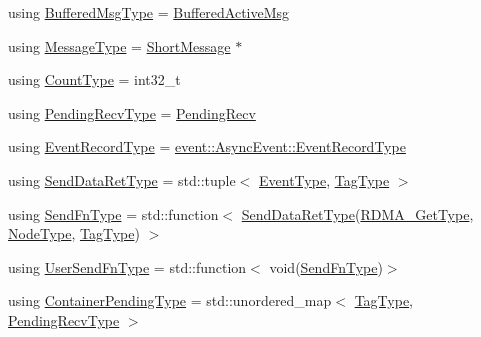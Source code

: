 \begin{DoxyCompactItemize}
\item 
using \hyperlink{structvt_1_1messaging_1_1_active_messenger_a80a9cbda399d7bf035bfcecc761f4b02}{Buffered\+Msg\+Type} = \hyperlink{structvt_1_1messaging_1_1_buffered_active_msg}{Buffered\+Active\+Msg}
\item 
using \hyperlink{structvt_1_1messaging_1_1_active_messenger_a8a749506cb4813230f9bfeeac1b119c9}{Message\+Type} = \hyperlink{namespacevt_a1125ac1da6c0bbf141e0ea0739d7602d}{Short\+Message} $\ast$
\item 
using \hyperlink{structvt_1_1messaging_1_1_active_messenger_aa69cbede6a9fbc4d727bfb38d5546600}{Count\+Type} = int32\+\_\+t
\item 
using \hyperlink{structvt_1_1messaging_1_1_active_messenger_add1d7ab7bf168d53dfe7b93f29f64f02}{Pending\+Recv\+Type} = \hyperlink{structvt_1_1messaging_1_1_pending_recv}{Pending\+Recv}
\item 
using \hyperlink{structvt_1_1messaging_1_1_active_messenger_aed736a2b2eaa0f96971a4f0be3fe0a25}{Event\+Record\+Type} = \hyperlink{structvt_1_1event_1_1_async_event_a5b4ef37db6e5962fdc0e6e0e56e74bc1}{event\+::\+Async\+Event\+::\+Event\+Record\+Type}
\item 
using \hyperlink{structvt_1_1messaging_1_1_active_messenger_a839987e944b6b9c681bc56efbea1f220}{Send\+Data\+Ret\+Type} = std\+::tuple$<$ \hyperlink{namespacevt_a009267401def7ae8bf201892222d060f}{Event\+Type}, \hyperlink{namespacevt_a84ab281dae04a52a4b243d6bf62d0e52}{Tag\+Type} $>$
\item 
using \hyperlink{structvt_1_1messaging_1_1_active_messenger_a9821bc2d924729107f08fadf5a217537}{Send\+Fn\+Type} = std\+::function$<$ \hyperlink{structvt_1_1messaging_1_1_active_messenger_a839987e944b6b9c681bc56efbea1f220}{Send\+Data\+Ret\+Type}(\hyperlink{namespacevt_a1cab7f4860f65a49ad2c042d6240f288}{R\+D\+M\+A\+\_\+\+Get\+Type}, \hyperlink{namespacevt_a866da9d0efc19c0a1ce79e9e492f47e2}{Node\+Type}, \hyperlink{namespacevt_a84ab281dae04a52a4b243d6bf62d0e52}{Tag\+Type}) $>$
\item 
using \hyperlink{structvt_1_1messaging_1_1_active_messenger_a4b1993ad77436b6ed6c7fd32801c50ed}{User\+Send\+Fn\+Type} = std\+::function$<$ void(\hyperlink{structvt_1_1messaging_1_1_active_messenger_a9821bc2d924729107f08fadf5a217537}{Send\+Fn\+Type})$>$
\item 
using \hyperlink{structvt_1_1messaging_1_1_active_messenger_a388e97eeb72592e57551e045b43bcfde}{Container\+Pending\+Type} = std\+::unordered\+\_\+map$<$ \hyperlink{namespacevt_a84ab281dae04a52a4b243d6bf62d0e52}{Tag\+Type}, \hyperlink{structvt_1_1messaging_1_1_active_messenger_add1d7ab7bf168d53dfe7b93f29f64f02}{Pending\+Recv\+Type} $>$

\end{DoxyCompactItemize}
